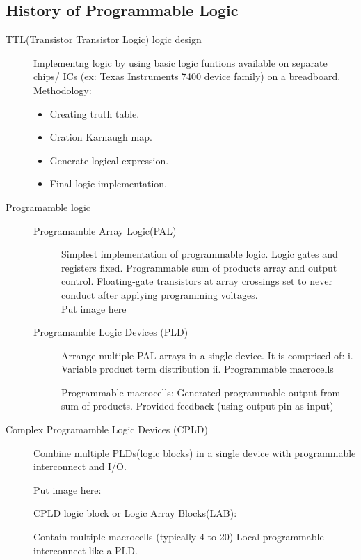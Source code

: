 \subsection{History of Programmable Logic}


\begin{description}
\item [TTL(Transistor Transistor Logic) logic design] Implementng logic by using basic logic funtions available on separate chips/ ICs (ex: Texas Instruments 7400 device family) on a breadboard. Methodology: 
    \begin{itemize}
    \item Creating truth table.
    \item Cration Karnaugh map.
    \item Generate logical expression.
    \item Final logic implementation.
    \end{itemize}

\item [Programamble logic] 
    \begin{description}
    \item  [Programamble Array Logic(PAL)] Simplest implementation of programmable logic. Logic gates and registers fixed. 
    Programmable sum of products array and output control. Floating-gate transistors at array crossings set to never conduct after applying programming voltages.
    \\ Put image here

    \item [Programamble Logic Devices (PLD)] Arrange multiple PAL arrays in a single device. It is comprised of: i. Variable product term distribution ii. Programmable macrocells

    Programmable macrocells:
    Generated programmable output from sum of products. Provided feedback (using output pin as input)

    \end{description}

\item [Complex Programamble Logic Devices (CPLD)] Combine multiple PLDs(logic blocks) in a single device with programmable interconnect and I/O.

Put image here:

CPLD logic block or Logic Array Blocks(LAB):

Contain multiple macrocells (typically 4 to 20)
Local programmable interconnect like a PLD.





\end{description}
